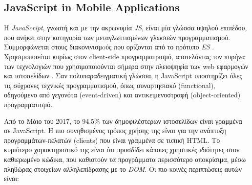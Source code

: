\subsection{JavaScript in Mobile Applications}
H \textit{JavaScript}, γνωστή και με την ακρωνυμία \textit{JS}, είναι μία γλώσσα υψηλού επιπέδου, που ανήκει στην κατηγορία των μεταγλωττισμένων γλωσσών προγραμματισμού. Συμμορφώνεται στους διακονινισμoύς που ορίζονται από το πρότυπο \textit{ES} \cite{[JS1]}. Χρησιμοποιείται κυρίως στον client-side προγραμματρισμό, αποτελόντας τον πυρήνα των τεχνολογιών που χρησιμοποιούνται σήμερα στην πλειοψηφία των web εφαρμογών και ιστοσελίδων \cite{[JS2]}. Σαν πολυπαραδειγματική γλώσσα, η  JavaScript υποστηρίζει όλες τις σύχρονες τεχνικές προγραμματισμού, όπως συναρτησιακό (functional), οδηγούμενο από γεγονότα (event-driven) και αντικειμενοστραφή (object-oriented) προγραμματισμό. 

Από το Μάιο του 2017, το 94.5\% των δημοφιλέστερων ιστοσελίδων είναι γραμμένα σε  JavaScript. Η πιο συνηθισμένος τρόπος χρήσης της είναι για την ανάπτυξη προγραμμάτων-πελατών (clients) που είναι γραμμένα σε τυπική HTML. Το κυριότερο χαρακτηριστικό της είναι ότι προσδίδει κάποιες χρηστικές ιδιότητες στον καθιερωμένο κώδικα, που καθιστούν τα προγράμματα περισσότερο αποκρίσιμα, μέσω πληθώρας στοιχείων αλληλεπίδρασης με το \textit{DOM}. Οι πιο κοινές περιπτώσεις αυτών είναι:  

